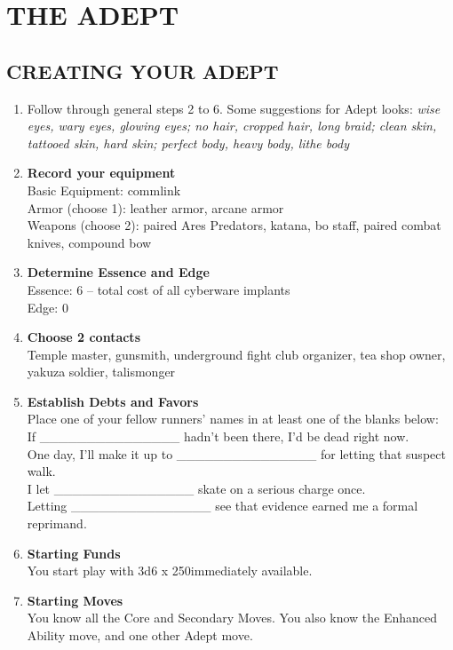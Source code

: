 \clearpage
\section{THE ADEPT}

\subsection{CREATING YOUR ADEPT}
\begin{enumerate}
    \item Follow through general steps 2 to 6. Some suggestions for Adept looks: \textit{wise eyes, wary eyes, glowing eyes; no hair, cropped hair, long braid; clean skin, tattooed skin, hard skin; perfect body, heavy body, lithe body}
    \item \textbf{Record your equipment} \\
    Basic Equipment: commlink \\
    Armor (choose 1): leather armor, arcane armor \\
    Weapons (choose 2): paired Ares Predators, katana, bo staff, paired combat knives, compound bow
    \item \textbf{Determine Essence and Edge} \\
    Essence: 6 – total cost of all cyberware implants \\
    Edge: 0
    \item \textbf{Choose 2 contacts} \\
    Temple master, gunsmith, underground fight club organizer, tea shop owner, yakuza soldier, talismonger
    \item \textbf{Establish Debts and Favors} \\
    Place one of your fellow runners’ names in at least one of the blanks below: \\
    If \_\_\_\_\_\_\_\_\_\_\_\_\_\_\_ hadn’t been there, I’d be dead right now. \\
    One day, I’ll make it up to \_\_\_\_\_\_\_\_\_\_\_\_\_\_\_ for letting that suspect walk. \\
    I let \_\_\_\_\_\_\_\_\_\_\_\_\_\_\_ skate on a serious charge once. \\
    Letting \_\_\_\_\_\_\_\_\_\_\_\_\_\_\_ see that evidence earned me a formal reprimand.
    \item \textbf{Starting Funds} \\
    You start play with 3d6 x 250\nuyen immediately available.
    \item \textbf{Starting Moves} \\
    You know all the Core and Secondary Moves. You also know the Enhanced Ability move, and one other Adept move.
\end{enumerate}



